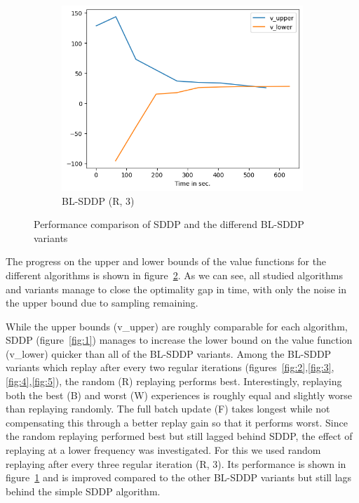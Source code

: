 \documentclass[a4paper,12pt]{article}
\begin{document}
\begin{figure}[h]
\begin{subfigure}{0.32\textwidth}
  \includegraphics[width=\linewidth]{blsddp_6_random_3.png}
  \caption{BL-SDDP (R, 3)}
  \label{fig:6}
\end{subfigure}
\caption{Performance comparison of SDDP and the differend BL-SDDP variants}
\label{fig: performance}
\end{figure}

The progress on the upper and lower bounds of the value functions for the different algorithms is shown in figure~\ref{fig: performance}.
As we can see, all studied algorithms and variants manage to close the optimality gap in time, with only the noise in the upper bound due to sampling remaining. 

While the upper bounds (v\_upper) are roughly comparable for each algorithm, SDDP (figure~\ref{fig:1}) manages to increase the lower bound on the value function (v\_lower) quicker than all of the BL-SDDP variants. Among the BL-SDDP variants which replay after every two regular iterations (figures~\ref{fig:2},\ref{fig:3},\ref{fig:4},\ref{fig:5}), the random (R) replaying performs best. Interestingly, replaying both the best (B) and worst (W) experiences is roughly equal and slightly worse than replaying randomly. The full batch update (F) takes longest while not compensating this through a better replay gain so that it performs worst.
Since the random replaying performed best but still lagged behind SDDP, the effect of replaying at a lower frequency was investigated. For this we used random replaying after every three regular iteration (R, 3). Its performance is shown in figure~\ref{fig:6} and is improved compared to the other BL-SDDP variants but still lags behind the simple SDDP algorithm.
\end{document}
